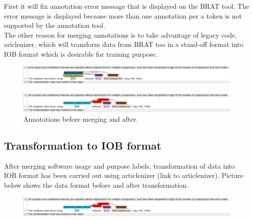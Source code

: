 First it will fix annotation error message that is displayed on the BRAT tool. The error message is displayed because more than one annotation per a token is not supported by the annotation tool. \\

The other reason for merging annotations is to take advantage of legacy code, ariclenizer, which will transform data from BRAT too in a stand-off format  into IOB format which is desirable for training purpose. 

\begin{figure}[htbp]
	\centering
	\includegraphics[width=1\textwidth]{4.graphics/figures/chap4/merging/2002515_plm_unm}
	
	\label{fig:chapter04:setup}
\end{figure}

\begin{figure}[htbp]
	\centering
	\includegraphics[width=1\textwidth]{4.graphics/figures/chap4/merging/2002515_plm}
	\caption{Annotations before merging and after.}
	\label{fig:chapter04:setup}
\end{figure}




\subsection{Transformation to IOB format}
\label{subsec:dataset:preprocessing:Transformation}
After merging software usage and purpose labels, transformation of data into IOB format has been carried out using articlenizer (link to articlenizer). Picture below shows the data format before and after transformation. 

\begin{figure}[htbp]
	\centering
	\includegraphics[width=1\textwidth]{4.graphics/figures/chap4/merging/2002515_plm}
	
	\label{fig:chapter04:setup}
\end{figure}

